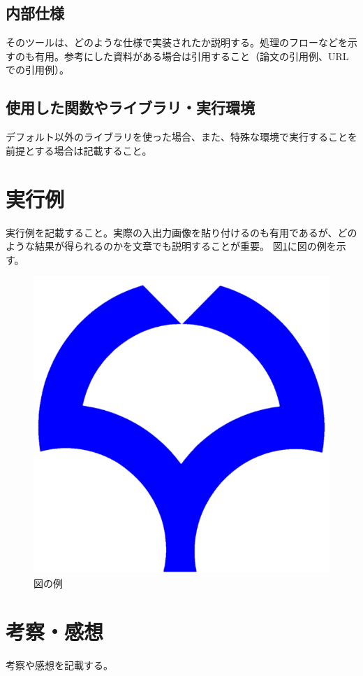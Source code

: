 \documentclass[twocolumn, a4paper]{jsarticle}
\begin{document}
\subsection{内部仕様}
そのツールは、どのような仕様で実装されたか説明する。処理のフローなどを示すのも有用。参考にした資料がある場合は引用すること（論文の引用例\cite{canny}、URLでの引用例\cite{material}）。

\subsection{使用した関数やライブラリ・実行環境}
デフォルト以外のライブラリを使った場合、また、特殊な環境で実行することを前提とする場合は記載すること。


\section{実行例}
実行例を記載すること。実際の入出力画像を貼り付けるのも有用であるが、どのような結果が得られるのかを文章でも説明することが重要。
図\ref{fig:ou}に図の例を示す。

\begin{figure}[t]
\centering
\includegraphics[width=\linewidth]{ou.png}
\caption{図の例}
\label{fig:ou}
\end{figure}

\section{考察・感想}
考察や感想を記載する。
\end{document}
